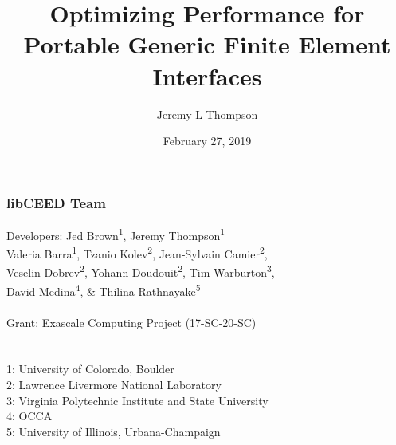 \documentclass{beamer}
\title[libCEED Finite Element Library]{Optimizing Performance for Portable Generic Finite Element Interfaces} %
\author{Jeremy L Thompson} %
\institute[CU Boulder] %
{University of Colorado Boulder \\ %
\medskip
\textit{jeremy.thompson@colorado.edu} %
}
\date{February 27, 2019} %
\begin{document}
\begin{frame}
\titlepage %
\end{frame}


\begin{frame}
\begin{center}
\frametitle{libCEED Team}

{\flushleft

Developers: \hspace{2mm} Jed Brown\textsuperscript{1}, Jeremy Thompson\textsuperscript{1} \\
\hspace{23mm} Valeria Barra\textsuperscript{1}, Tzanio Kolev\textsuperscript{2}, Jean-Sylvain Camier\textsuperscript{2},\\
\hspace{23mm} Veselin Dobrev\textsuperscript{2}, Yohann Doudouit\textsuperscript{2}, Tim Warburton\textsuperscript{3},\\
\hspace{23mm} David Medina\textsuperscript{4}, \& Thilina Rathnayake\textsuperscript{5}\\

~\\

Grant: \hspace{11mm} Exascale Computing Project (17-SC-20-SC)\\

~\\

~\\

\small{1: University of Colorado, Boulder\\
2: Lawrence Livermore National Laboratory\\
3: Virginia Polytechnic Institute and State University\\
4: OCCA\\
5: University of Illinois, Urbana-Champaign\\}}

\end{center}
\end{frame}
\end{document}
